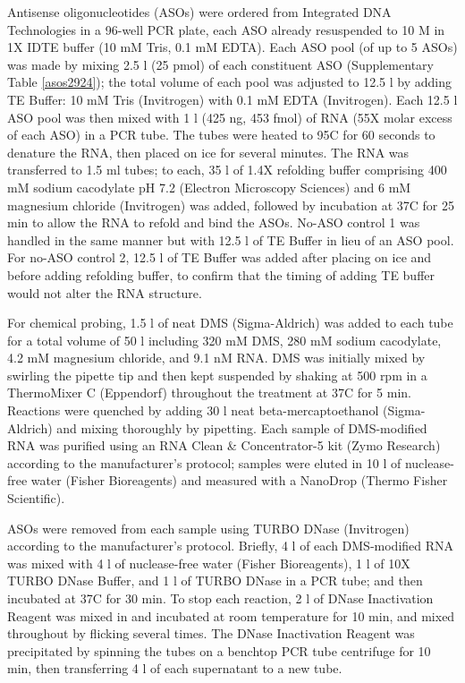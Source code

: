 \documentclass[main.tex]{subfiles}
\begin{document}
Antisense oligonucleotides (ASOs) were ordered from Integrated DNA Technologies in a 96-well PCR plate, each ASO already resuspended to 10 \textmu M in 1X IDTE buffer (10 mM Tris, 0.1 mM EDTA).
Each ASO pool (of up to 5 ASOs) was made by mixing 2.5 \textmu l (25 pmol) of each constituent ASO (Supplementary Table \ref{asos2924}); the total volume of each pool was adjusted to 12.5 \textmu l by adding TE Buffer: 10 mM Tris (Invitrogen) with 0.1 mM EDTA (Invitrogen).
Each 12.5 \textmu l ASO pool was then mixed with 1 \textmu l (425 ng, 453 fmol) of RNA (55X molar excess of each ASO) in a PCR tube.
The tubes were heated to 95\textdegree C for 60 seconds to denature the RNA, then placed on ice for several minutes.
The RNA was transferred to 1.5 ml tubes; to each, 35 \textmu l of 1.4X refolding buffer comprising 400 mM sodium cacodylate pH 7.2 (Electron Microscopy Sciences) and 6 mM magnesium chloride (Invitrogen) was added, followed by incubation at 37\textdegree C for 25 min to allow the RNA to refold and bind the ASOs.
No-ASO control 1 was handled in the same manner but with 12.5 \textmu l of TE Buffer in lieu of an ASO pool.
For no-ASO control 2, 12.5 \textmu l of TE Buffer was added after placing on ice and before adding refolding buffer, to confirm that the timing of adding TE buffer would not alter the RNA structure.

For chemical probing, 1.5 \textmu l of neat DMS (Sigma-Aldrich) was added to each tube for a total volume of 50 \textmu l including 320 mM DMS, 280 mM sodium cacodylate, 4.2 mM magnesium chloride, and 9.1 nM RNA.
DMS was initially mixed by swirling the pipette tip and then kept suspended by shaking at 500 rpm in a ThermoMixer C (Eppendorf) throughout the treatment at 37\textdegree C for 5 min.
Reactions were quenched by adding 30 \textmu l neat beta-mercaptoethanol (Sigma-Aldrich) and mixing thoroughly by pipetting.
Each sample of DMS-modified RNA was purified using an RNA Clean \& Concentrator-5 kit (Zymo Research) according to the manufacturer's protocol; samples were eluted in 10 \textmu l of nuclease-free water (Fisher Bioreagents) and measured with a NanoDrop (Thermo Fisher Scientific).

ASOs were removed from each sample using TURBO DNase (Invitrogen) according to the manufacturer's protocol.
Briefly, 4 \textmu l of each DMS-modified RNA was mixed with 4 \textmu l of nuclease-free water (Fisher Bioreagents), 1 \textmu l of 10X TURBO DNase Buffer, and 1 \textmu l of TURBO DNase in a PCR tube; and then incubated at 37\textdegree C for 30 min.
To stop each reaction, 2 \textmu l of DNase Inactivation Reagent was mixed in and incubated at room temperature for 10 min, and mixed throughout by flicking several times.
The DNase Inactivation Reagent was precipitated by spinning the tubes on a benchtop PCR tube centrifuge for 10 min, then transferring 4 \textmu l of each supernatant to a new tube.
\end{document}
